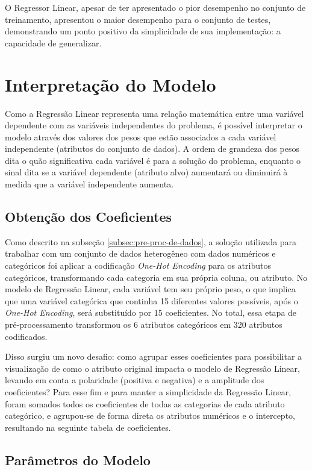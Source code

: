 \documentclass{report}
\let\oldsection\section
\renewcommand\section{\clearpage\oldsection}
\begin{document}
O Regressor Linear, apesar de ter apresentado o pior desempenho
no conjunto de treinamento, apresentou o maior desempenho para o conjunto de testes, demonstrando um ponto positivo da simplicidade de sua implementação: a capacidade de generalizar.

\section{Interpretação do Modelo}

Como a Regressão Linear representa uma relação matemática entre uma variável dependente com as variáveis independentes do problema, é possível interpretar o modelo através dos valores dos pesos
que estão associados a cada variável independente (atributos do conjunto de dados). A ordem de grandeza dos pesos dita o quão significativa cada variável é para a solução do problema, enquanto o
sinal dita se a variável dependente (atributo alvo) aumentará ou diminuirá à medida que a variável independente aumenta.

\subsection{Obtenção dos Coeficientes}

Como descrito na subseção \ref{subsec:pre-proc-de-dados}, a solução utilizada para trabalhar com um conjunto de dados heterogêneo com dados numéricos e categóricos foi aplicar a codificação \textit{One-Hot Encoding}
para os atributos categóricos, transformando cada categoria em sua própria coluna, ou atributo. No modelo de Regressão Linear, cada variável tem seu próprio peso, o que implica que uma variável categórica que continha
15 diferentes valores possíveis, após o \textit{One-Hot Encoding}, será substituído por 15 coeficientes. No total, essa etapa de pré-processamento transformou os 6 atributos categóricos em 320 atributos codificados.

Disso surgiu um novo desafio: como agrupar esses coeficientes para possibilitar a visualização de como o atributo original impacta o modelo de Regressão Linear, levando em conta a polaridade (positiva e negativa) e a amplitude
dos coeficientes? Para esse fim e para manter a simplicidade da Regressão Linear, foram somados todos os coeficientes de todas as categorias de cada atributo categórico, e agrupou-se de forma direta os atributos numéricos e o intercepto,
resultando na seguinte tabela de coeficientes.

\subsection{Parâmetros do Modelo}
\end{document}
